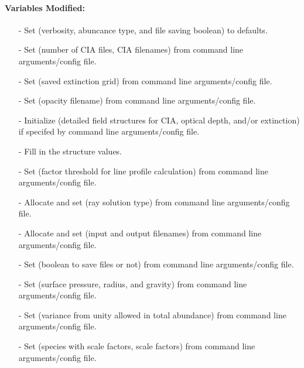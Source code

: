 \documentclass[letterpaper,12pt]{article}
\begin{document}
\paragraph{Variables Modified:}
\begin{enumerate}[leftmargin=10pt, noitemsep, parsep=0pt, topsep=0ex]
\item[-] Set  (verbosity, abuncance type, and file saving boolean) to defaults.
\item[-] Set  (number of CIA files, CIA filenames) from command line arguments/config file.
\item[-] Set  (saved extinction grid) from command line arguments/config file.
\item[-] Set  (opacity filename) from command line arguments/config file.
\item[-] Initialize  (detailed field structures for CIA, optical depth, and/or extinction) if specifed by command line arguments/config file.
\item[-] Fill in the  structure values.
\item[-] Set  (factor threshold for line profile calculation) from command line arguments/config file.
\item[-] Allocate and set  (ray solution type) from command line arguments/config file.
\item[-] Allocate and set  (input and output filenames) from command line arguments/config file.
\item[-] Set  (boolean to save files or not) from command line arguments/config file.
\item[-] Set  (surface pressure, radius, and gravity) from command line arguments/config file.
\item[-] Set  (variance from unity allowed in total abundance) from command line arguments/config file.
\item[-] Set  (species with scale factors, scale factors) from command line arguments/config file.

\end{enumerate}
\end{document}
